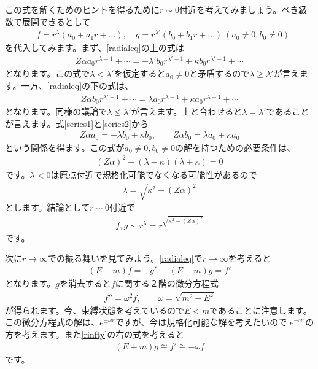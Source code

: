 \documentclass[report,paper=a4, fontsize=12pt, line_length=16cm, number_of_lines=33,dvipdfmx]{jlreq}
\numberwithin{equation}{chapter}
\begin{document}
この式を解くためのヒントを得るために$r\sim 0$付近を考えてみましょう。べき級数で展開できるとして
\begin{align}
  &f=r^{\lambda}(a_0+a_1r+\dots),\quad g=r^{\lambda'}(b_0+b_1r+\dots)\ (a_0\ne 0,b_0\ne 0)
\end{align}
を代入してみます。まず、\eqref{radialeq}の上の式は
\begin{align}
  Z\alpha a_0r^{\lambda-1}+\cdots = -\lambda'b_0r^{\lambda'-1}+\kappa b_0r^{\lambda'-1}+\cdots
  \label{series1}
\end{align}
となります。この式で$\lambda<\lambda'$を仮定すると$a_0\ne 0$と矛盾するので$\lambda \ge \lambda'$が言えます。一方、\eqref{radialeq}の下の式は、
\begin{align}
  Z\alpha b_0r^{\lambda'-1}+\cdots = \lambda a_0r^{\lambda-1}+\kappa a_0r^{\lambda-1}+\cdots
  \label{series2}
\end{align}
となります。同様の議論で$\lambda\le \lambda'$が言えます。上と合わせると$\lambda=\lambda'$であることが言えます。式\eqref{series1}と\eqref{series2}から
\begin{align}
  Z\alpha a_0=-\lambda b_0+\kappa b_0,\qquad
  Z\alpha b_0=\lambda a_0+\kappa a_0
\end{align}
という関係を得ます。この式が$a_0\ne 0,b_0\ne 0$の解を持つための必要条件は、
\begin{align*}
  (Z\alpha)^{2}+(\lambda-\kappa)(\lambda+\kappa)=0
\end{align*}
です。$\lambda<0$は原点付近で規格化可能でなくなる可能性があるので
\begin{align}
  \lambda=\sqrt{\kappa^2-(Z\alpha)^2}
\end{align}
とします。結論として$r\sim 0$付近で
\begin{align}
  f,g\sim r^{\lambda}=r^{\sqrt{\kappa^2-(Z\alpha)^2}}
\end{align}
です。

次に$r\to\infty$での振る舞いを見てみよう。\eqref{radialeq}で$r\to\infty$を考えると
\begin{align}
  (E-m)f=-g',\quad
  (E+m)g=f'\label{rinfty}
\end{align}
となります。$g$を消去すると$f$に関する２階の微分方程式
\begin{align}
  f''=\omega^2f,\qquad \omega=\sqrt{m^2-E^2}
\end{align}
が得られます。今、束縛状態を考えているので$E<m$であることに注意します。
この微分方程式の解は、$e^{\pm \omega r}$ですが、今は規格化可能な解を考えたいので
$e^{-\omega r}$の方を考えます。また\eqref{rinfty}の右の式を考えると
\begin{align}
  (E+m)g\cong f'\cong -\omega f
\end{align}
です。
\end{document}
